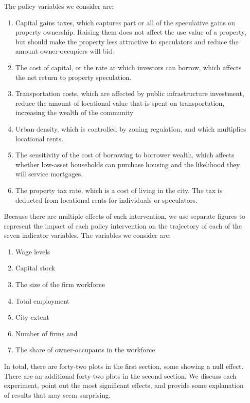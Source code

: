 The policy variables we consider are: 
\begin{enumerate}
\item Capital gains taxes, which captures part or all of the speculative gains on property ownership. Raising them does not affect the use value of a property, but should make the property less attractive to speculators and reduce the amount owner-occupiers will bid. 
\item The cost of capital, or the rate at which investors can borrow, which affects the net return to property speculation.
\item Transportation costs, which are affected by public infrastructure investment, reduce the amount of locational value that is spent on transportation, increasing the wealth of the community 
\item Urban density, which is controlled by zoning regulation, and which multiplies locational rents. 
\item The sensitivity of the cost of borrowing to borrower wealth, which affects whether low-asset households can purchase housing and the likelihood they will service mortgages.
\item The property tax rate, which is a cost of living in the city. The tax is deducted from locational rents for individuals or speculators.
\end{enumerate}
Because there are multiple effects of each intervention, we use separate figures to represent the impact of each policy intervention on the trajectory of each of the seven indicator variables. %
The variables we consider are:
\begin{enumerate}
    \item Wage levels
    \item Capital stock
    \item The size of the firm workforce
    \item Total employment
    \item City extent
    \item Number of firms and 
    \item The share of owner-occupants in the workforce
\end{enumerate} 
In total, there are forty-two plots in the first section, some showing a null effect. There are an additional forty-two plots in the second section. We discuss each experiment, point out the most significant effects, and provide some explanation of results that may seem surprising.  


